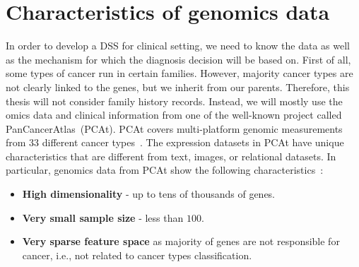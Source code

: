 \section{Characteristics of genomics data}
In order to develop a DSS for clinical setting, we need to know the data as well as the mechanism for which the diagnosis decision will be based on. First of all, some types of cancer run in certain families. However, majority cancer types are not clearly linked to the genes, but we inherit from our parents. Therefore, this thesis will not consider family history records. Instead, we will mostly use the omics data and clinical information from one of the well-known project called PanCancerAtlas~(PCAt). PCAt covers multi-platform genomic measurements from 33 different cancer types~\cite{pancan}. 
The expression datasets in PCAt have unique characteristics that are different from text, images, or relational datasets. In particular, genomics data from PCAt show the following characteristics~\cite{lu2003cancer}:

\vspace{-2mm}
\begin{itemize}[noitemsep]
    \item \textbf{High dimensionality} - up to tens of thousands of genes.
    \item \textbf{Very small sample size} - less than $100$.
    \item \textbf{Very sparse feature space} as majority of genes are not responsible for cancer, i.e., not related to cancer types classification.
\end{itemize}
\vspace{-2mm}

